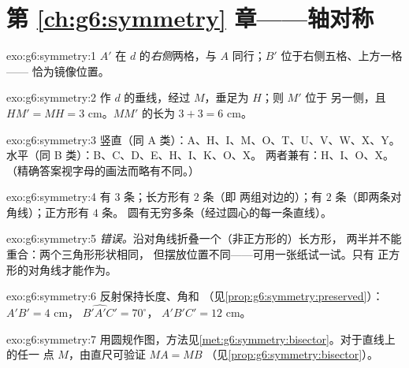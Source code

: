 \section*{第 \ref{ch:g6:symmetry} 章——轴对称}

\begin{solution}{exo:g6:symmetry:1}
$A'$ 在 $d$ 的\emph{右侧}两格，与
$A$ 同行；$B'$ 位于右侧五格、上方一格——
恰为镜像位置。
\end{solution}

\begin{solution}{exo:g6:symmetry:2}
作 $d$ 的垂线，经过 $M$，垂足为 $H$；则 $M'$ 位于
另一侧，且 $HM' = MH = 3$ cm。$MM'$ 的长为
$3 + 3 = 6$ cm。
\end{solution}

\begin{solution}{exo:g6:symmetry:3}
竖直（同 A 类）：A、H、I、M、O、T、U、V、W、X、Y。
水平（同 B 类）：B、C、D、E、H、I、K、O、X。
两者兼有：H、I、O、X。
（精确答案视字母的画法而略有不同。）
\end{solution}

\begin{solution}{exo:g6:symmetry:4}
有 $3$ 条；长方形有 $2$ 条（即
两组对边的）；有 $2$ 条（即两条对角线）；正方形有 $4$ 条。
圆有无穷多条（经过圆心的每一条直线）。
\end{solution}

\begin{solution}{exo:g6:symmetry:5}
\emph{错误。}沿对角线折叠一个（非正方形的）长方形，
两半并不能重合：两个三角形形状相同，
但摆放位置不同——可用一张纸试一试。只有
正方形的对角线才能作为。
\end{solution}

\begin{solution}{exo:g6:symmetry:6}
反射保持长度、角和
（见\cref{prop:g6:symmetry:preserved}）：$A'B' = 4$ cm，
$\widehat{B'A'C'} = 70^\circ$， $A'B'C' = 12$ cm。
\end{solution}

\begin{solution}{exo:g6:symmetry:7}
用圆规作图，方法见\cref{met:g6:symmetry:bisector}。对于直线上的任一
点 $M$，由直尺可验证 $MA = MB$
（见\cref{prop:g6:symmetry:bisector}）。
\end{solution}


